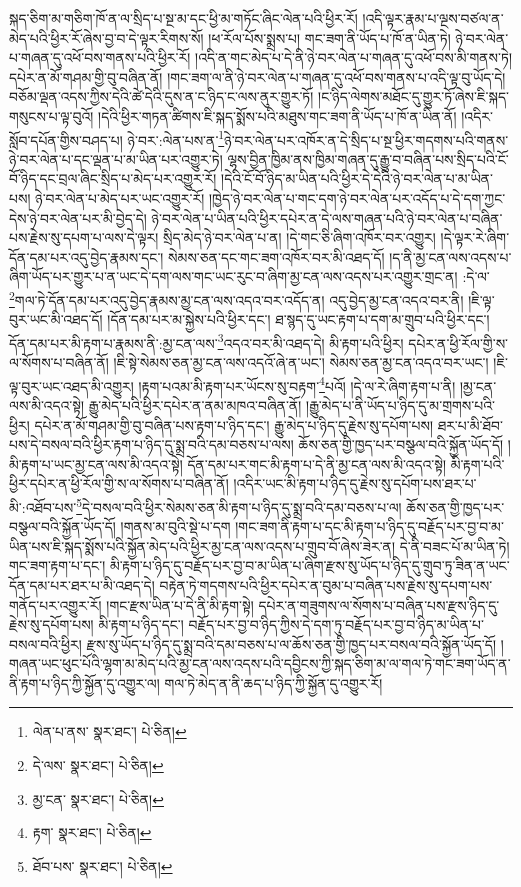 སྐད་ཅིག་མ་གཅིག་ཁོ་ན་ལ་སྲིད་པ་སྔ་མ་དང་ཕྱི་མ་གཏོང་ཞིང་ལེན་པའི་ཕྱིར་རོ། །འདི་ལྟར་རྣམ་པ་ལྔས་བཙལ་ན་མེད་པའི་ཕྱིར་རོ་ཞེས་བྱ་བ་དེ་ལྟར་རིགས་སོ། །ཕ་རོལ་པོས་སྨྲས་པ། གང་ཟག་ནི་ཡོད་པ་ཁོ་ན་ཡིན་ཏེ། ཉེ་བར་ལེན་པ་གཞན་དུ་འཕོ་བས་གནས་པའི་ཕྱིར་རོ། །འདི་ན་གང་མེད་པ་དེ་ནི་ཉེ་བར་ལེན་པ་གཞན་དུ་འཕོ་བས་མི་གནས་ཏེ། དཔེར་ན་མོ་གཤམ་གྱི་བུ་བཞིན་ནོ། །གང་ཟག་ལ་ནི་ཉེ་བར་ལེན་པ་གཞན་དུ་འཕོ་བས་གནས་པ་འདི་ལྟ་བུ་ཡོད་དེ། བཅོམ་ལྡན་འདས་ཀྱིས་དེའི་ཚེ་དེའི་དུས་ན་ང་ཉིད་ང་ལས་ནུར་གྱུར་ཏོ། །ང་ཉིད་ལེགས་མཐོང་དུ་གྱུར་ཏོ་ཞེས་ཇི་སྐད་གསུངས་པ་ལྟ་བུའོ། །དེའི་ཕྱིར་གཏན་ཚིགས་ཇི་སྐད་སྨོས་པའི་མཐུས་གང་ཟག་ནི་ཡོད་པ་ཁོ་ན་ཡིན་ནོ། །འདིར་སློབ་དཔོན་གྱིས་བཤད་པ། ཉེ་བར་:ལེན་པས་ན་\footnote{ལེན་པ་ནས་  སྣར་ཐང་།  པེ་ཅིན། }ཉེ་བར་ལེན་པར་འཁོར་ན་དེ་སྲིད་པ་སྔ་ཕྱིར་གདགས་པའི་གནས་ཉེ་བར་ལེན་པ་དང་ལྡན་པ་མ་ཡིན་པར་འགྱུར་ཏེ། ལྷས་བྱིན་ཁྱིམ་ནས་ཁྱིམ་གཞན་དུ་རྒྱུ་བ་བཞིན་པས་སྲིད་པའི་ངོ་བོ་ཉིད་དང་བྲལ་ཞིང་སྲིད་པ་མེད་པར་འགྱུར་རོ། །དེའི་ངོ་བོ་ཉིད་མ་ཡིན་པའི་ཕྱིར་དེ་དེའི་ཉེ་བར་ལེན་པ་མ་ཡིན་པས། ཉེ་བར་ལེན་པ་མེད་པར་ཡང་འགྱུར་རོ། །ཁྱེད་ཉེ་བར་ལེན་པ་གང་དག་ཉེ་བར་ལེན་པར་འདོད་པ་དེ་དག་ཀྱང་དེས་ཉེ་བར་ལེན་པར་མི་བྱེད་དེ། ཉེ་བར་ལེན་པ་ཡིན་པའི་ཕྱིར་དཔེར་ན་དེ་ལས་གཞན་པའི་ཉེ་བར་ལེན་པ་བཞིན་པས་རྗེས་སུ་དཔག་པ་ལས་དེ་ལྟར། སྲིད་མེད་ཉེ་བར་ལེན་པ་ན། །དེ་གང་ཅི་ཞིག་འཁོར་བར་འགྱུར། །དེ་ལྟར་རེ་ཞིག་དོན་དམ་པར་འདུ་བྱེད་རྣམས་དང་། སེམས་ཅན་དང་གང་ཟག་འཁོར་བར་མི་འཐད་དོ། །ད་ནི་མྱ་ངན་ལས་འདས་པ་ཞིག་ཡོད་པར་གྱུར་པ་ན་ཡང་དེ་དག་ལས་གང་ཡང་རུང་བ་ཞིག་མྱ་ངན་ལས་འདས་པར་འགྱུར་གྲང་ན། :དེ་ལ་\footnote{དེ་ལས་  སྣར་ཐང་།  པེ་ཅིན། }གལ་ཏེ་དོན་དམ་པར་འདུ་བྱེད་རྣམས་མྱ་ངན་ལས་འདའ་བར་འདོད་ན། འདུ་བྱེད་མྱ་ངན་འདའ་བར་ནི། །ཇི་ལྟ་བུར་ཡང་མི་འཐད་དོ། །དོན་དམ་པར་མ་སྐྱེས་པའི་ཕྱིར་དང་། ཐ་སྙད་དུ་ཡང་རྟག་པ་དག་མ་གྲུབ་པའི་ཕྱིར་དང་། དོན་དམ་པར་མི་རྟག་པ་རྣམས་ནི་:མྱ་ངན་ལས་\footnote{མྱ་ངན་  སྣར་ཐང་།  པེ་ཅིན། }འདའ་བར་མི་འཐད་དེ། མི་རྟག་པའི་ཕྱིར། དཔེར་ན་ཕྱི་རོལ་གྱི་ས་ལ་སོགས་པ་བཞིན་ནོ། །ཇི་སྟེ་སེམས་ཅན་མྱ་ངན་ལས་འདའོ་ཞེ་ན་ཡང་། སེམས་ཅན་མྱ་ངན་འདའ་བར་ཡང་། །ཇི་ལྟ་བུར་ཡང་འཐད་མི་འགྱུར། །རྟག་པའམ་མི་རྟག་པར་ཡོངས་སུ་བརྟག་\footnote{རྟག་  སྣར་ཐང་།  པེ་ཅིན། }པའོ། །དེ་ལ་རེ་ཞིག་རྟག་པ་ནི། །མྱ་ངན་ལས་མི་འདའ་སྟེ། རྒྱུ་མེད་པའི་ཕྱིར་དཔེར་ན་ནམ་མཁའ་བཞིན་ནོ། །རྒྱུ་མེད་པ་ནི་ཡོད་པ་ཉིད་དུ་མ་གྲགས་པའི་ཕྱིར། དཔེར་ན་མོ་གཤམ་གྱི་བུ་བཞིན་པས་རྟག་པ་ཉིད་དང་། རྒྱུ་མེད་པ་ཉིད་དུ་རྗེས་སུ་དཔོག་པས། ཐར་པ་མི་ཐོབ་པས་དེ་བསལ་བའི་ཕྱིར་རྟག་པ་ཉིད་དུ་སྨྲ་བའི་དམ་བཅས་པ་ལས། ཆོས་ཅན་གྱི་ཁྱད་པར་བསྩལ་བའི་སྐྱོན་ཡོད་དོ། །མི་རྟག་པ་ཡང་མྱ་ངན་ལས་མི་འདའ་སྟེ། དོན་དམ་པར་གང་མི་རྟག་པ་དེ་ནི་མྱ་ངན་ལས་མི་འདའ་སྟེ། མི་རྟག་པའི་ཕྱིར་དཔེར་ན་ཕྱི་རོལ་གྱི་ས་ལ་སོགས་པ་བཞིན་ནོ། །འདིར་ཡང་མི་རྟག་པ་ཉིད་དུ་རྗེས་སུ་དཔོག་པས་ཐར་པ་མི་:འཐོབ་པས་\footnote{ཐོབ་པས་  སྣར་ཐང་།  པེ་ཅིན། }དེ་བསལ་བའི་ཕྱིར་སེམས་ཅན་མི་རྟག་པ་ཉིད་དུ་སྨྲ་བའི་དམ་བཅས་པ་ལ། ཆོས་ཅན་གྱི་ཁྱད་པར་བསྩལ་བའི་སྐྱོན་ཡོད་དོ། །གནས་མ་བུའི་སྡེ་པ་དག །གང་ཟག་ནི་རྟག་པ་དང་མི་རྟག་པ་ཉིད་དུ་བརྗོད་པར་བྱ་བ་མ་ཡིན་པས་ཇི་སྐད་སྨོས་པའི་སྐྱོན་མེད་པའི་ཕྱིར་མྱ་ངན་ལས་འདས་པ་གྲུབ་བོ་ཞེས་ཟེར་ན། དེ་ནི་བཟང་པོ་མ་ཡིན་ཏེ། གང་ཟག་རྟག་པ་དང་། མི་རྟག་པ་ཉིད་དུ་བརྗོད་པར་བྱ་བ་མ་ཡིན་པ་ཞིག་རྫས་སུ་ཡོད་པ་ཉིད་དུ་གྲུབ་ཏུ་ཟིན་ན་ཡང་དོན་དམ་པར་ཐར་པ་མི་འཐད་དེ། བརྟེན་ཏེ་གདགས་པའི་ཕྱིར་དཔེར་ན་བུམ་པ་བཞིན་པས་རྗེས་སུ་དཔག་པས་གནོད་པར་འགྱུར་རོ། །གང་རྫས་ཡིན་པ་དེ་ནི་མི་རྟག་སྟེ། དཔེར་ན་གཟུགས་ལ་སོགས་པ་བཞིན་པས་རྫས་ཉིད་དུ་རྗེས་སུ་དཔོག་པས། མི་རྟག་པ་ཉིད་དང་། བརྗོད་པར་བྱ་བ་ཉིད་ཀྱིས་དེ་དག་ཏུ་བརྗོད་པར་བྱ་བ་ཉིད་མ་ཡིན་པ་བསལ་བའི་ཕྱིར། རྫས་སུ་ཡོད་པ་ཉིད་དུ་སྨྲ་བའི་དམ་བཅས་པ་ལ་ཆོས་ཅན་གྱི་ཁྱད་པར་བསལ་བའི་སྐྱོན་ཡོད་དོ། །གཞན་ཡང་ཕུང་པོའི་ལྷག་མ་མེད་པའི་མྱ་ངན་ལས་འདས་པའི་དབྱིངས་ཀྱི་སྐད་ཅིག་མ་ལ་གལ་ཏེ་གང་ཟག་ཡོད་ན་ནི་རྟག་པ་ཉིད་ཀྱི་སྐྱོན་དུ་འགྱུར་ལ། གལ་ཏེ་མེད་ན་ནི་ཆད་པ་ཉིད་ཀྱི་སྐྱོན་དུ་འགྱུར་རོ། 